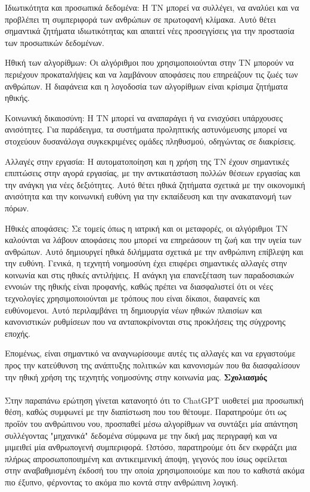 \documentclass{report}
\begin{document}
Ιδιωτικότητα και προσωπικά δεδομένα: Η ΤΝ μπορεί να συλλέγει, να αναλύει και να προβλέπει τη συμπεριφορά των ανθρώπων σε πρωτοφανή κλίμακα. Αυτό θέτει σημαντικά ζητήματα ιδιωτικότητας και απαιτεί νέες προσεγγίσεις για την προστασία των προσωπικών δεδομένων.

Ηθική των αλγορίθμων: Οι αλγόριθμοι που χρησιμοποιούνται στην ΤΝ μπορούν να περιέχουν προκαταλήψεις και να λαμβάνουν αποφάσεις που επηρεάζουν τις ζωές των ανθρώπων. Η διαφάνεια και η λογοδοσία των αλγορίθμων είναι κρίσιμα ζητήματα ηθικής.

Κοινωνική δικαιοσύνη: Η ΤΝ μπορεί να αναπαράγει ή να ενισχύσει υπάρχουσες ανισότητες. Για παράδειγμα, τα συστήματα προληπτικής αστυνόμευσης μπορεί να στοχεύουν δυσανάλογα συγκεκριμένες ομάδες πληθυσμού, οδηγώντας σε διακρίσεις.

Αλλαγές στην εργασία: Η αυτοματοποίηση και η χρήση της ΤΝ έχουν σημαντικές επιπτώσεις στην αγορά εργασίας, με την αντικατάσταση πολλών θέσεων εργασίας και την ανάγκη για νέες δεξιότητες. Αυτό θέτει ηθικά ζητήματα σχετικά με την οικονομική ανισότητα και την κοινωνική ευθύνη για την εκπαίδευση και την ανακατανομή των πόρων.

Ηθικές αποφάσεις: Σε τομείς όπως η ιατρική και οι μεταφορές, οι αλγόριθμοι ΤΝ καλούνται να λάβουν αποφάσεις που μπορεί να επηρεάσουν τη ζωή και την υγεία των ανθρώπων. Αυτό δημιουργεί ηθικά διλήμματα σχετικά με την ανθρώπινη επίβλεψη και την ευθύνη.
Γενικά, η τεχνητή νοημοσύνη έχει επιφέρει σημαντικές αλλαγές στην κοινωνία και στις ηθικές αντιλήψεις. Η ανάγκη για επανεξέταση των παραδοσιακών εννοιών της ηθικής είναι προφανής, καθώς πρέπει να διασφαλιστεί ότι οι νέες τεχνολογίες χρησιμοποιούνται με τρόπους που είναι δίκαιοι, διαφανείς και ευθύνομενοι. Αυτό περιλαμβάνει τη δημιουργία νέων ηθικών πλαισίων και κανονιστικών ρυθμίσεων που να ανταποκρίνονται στις προκλήσεις της σύγχρονης εποχής.

Επομένως, είναι σημαντικό να αναγνωρίσουμε αυτές τις αλλαγές και να εργαστούμε προς την κατεύθυνση της ανάπτυξης πολιτικών και κανονισμών που θα διασφαλίσουν την ηθική χρήση της τεχνητής νοημοσύνης στην κοινωνία μας.
\textbf{Σχολιασμός}\\\\
Στην παραπάνω ερώτηση γίνεται κατανοητό ότι το ChatGPT υιοθετεί  μια προσωπική θέση, καθώς συμφωνεί με την διαπίστωση που του θέτουμε. Παρατηρούμε ότι ως προΐόν του ανθρώπινου νου, προσπαθεί μέσω αλγορίθμων να συντάξει μία απάντηση συλλέγοντας "μηχανικά" δεδομένα σύμφωνα με την δική μας περιγραφή και να μιμειθεί μία ανθρωπογενή συμπεριφορά. Ωστόσο, παρατηρούμε ότι δεν εκφράζει μια πλήρως απροσωποποιημένη και αντικειμενική άποψη, γεγονός που ίσως οφείλεται στην αναβαθμισμένη έκδοσή του την οποία χρησιμοποιούμε και που το καθιστά ακόμα πιο έξυπνο, φέρνοντας το ακόμα πιο κοντά στην ανθρώπινη λογική. \\\\
\end{document}
